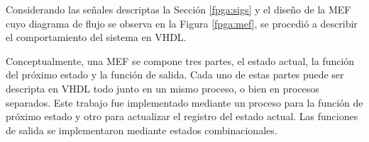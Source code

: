 Considerando las señales descriptas la Sección \ref{fpga:sigs} y el diseño de la MEF cuyo diagrama de flujo se observa en la Figura \ref{fpga:mef}, se procedió a describir el comportamiento del sistema en VHDL.

%
%

Conceptualmente, una MEF se compone tres partes, el estado actual, la función del próximo estado y la función de salida. Cada uno de estas partes puede ser descripta en VHDL todo junto en un mismo proceso, o bien en procesos separados. Este trabajo fue implementado mediante un proceso para la función de próximo estado y otro para actualizar el registro del estado actual. Las funciones de salida se implementaron mediante estados combinacionales.

